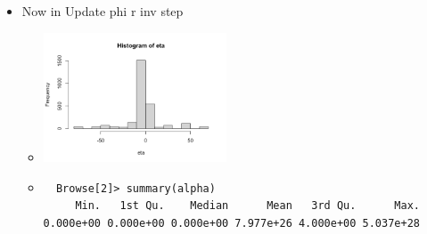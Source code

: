\documentclass[10pt]{article}
\theoremstyle{definition}
\begin{document}
\begin{itemize}
It seems like the 'update' value isnt changing at all? Check this.

So one problem is that it doesn't change within loops. Does it change after calculating phi and rho? Check.

This is definetly some sort of problem.

Current value for update
\begin{verbatim}
   [1]  46.2016753 -47.3258792  -6.1901234  11.6566619  -4.7021419   3.6183032  -6.3952101
 [8]   6.3162696  -5.3106373   4.4185593  -6.6760288   5.7370180  -6.1907947   5.1419914
[15]  -6.6558117   5.5859662  -5.5437446   4.4394525  -6.7754318   5.6839888  21.3286876
[22] -22.2086941  -6.8085055   5.6762828  -5.1983832   4.4678220  -6.6312077   5.5477890
[29]  -3.3886343   2.5882506  -6.7459322   6.1195971  -4.4694171   3.4240657  -6.5218785
[36]   6.1263917  10.5371811 -11.5680454  -5.1779672   4.0250935  -6.2453704   5.1017399
[43]  -6.8097845   5.7015088  -6.1182510   4.9906303  -6.6345801   5.5203673  39.1947088
[50] -40.3184609   0.6062871  22.6626964  -3.7255341   2.6365179  -6.7033879   5.6927960
[57]  67.2184146 -63.0972211  -6.8193206   5.7064405  -4.9738631   3.8700908  -6.7519904
[64]   5.6536608  -4.7809281   3.7102062  -6.7036938   6.0152241   0.2275543  -0.9651037
[71]  -6.7608940   5.6802879  -5.8318696   4.7273785  -5.3378333   5.6281093  -1.7353577
[78]   1.6122465
\end{verbatim}


\item Now in Update phi r inv step

\begin{itemize}
  \item
	\includegraphics[width=0.45\textwidth]{img/Spring_2022_Journal-94ff41c0.png}


\item
\begin{verbatim}
  Browse[2]> summary(alpha)
     Min.   1st Qu.    Median      Mean   3rd Qu.      Max.
0.000e+00 0.000e+00 0.000e+00 7.977e+26 4.000e+00 5.037e+28
\end{verbatim}
\end{itemize}


\end{itemize}
\end{document}
